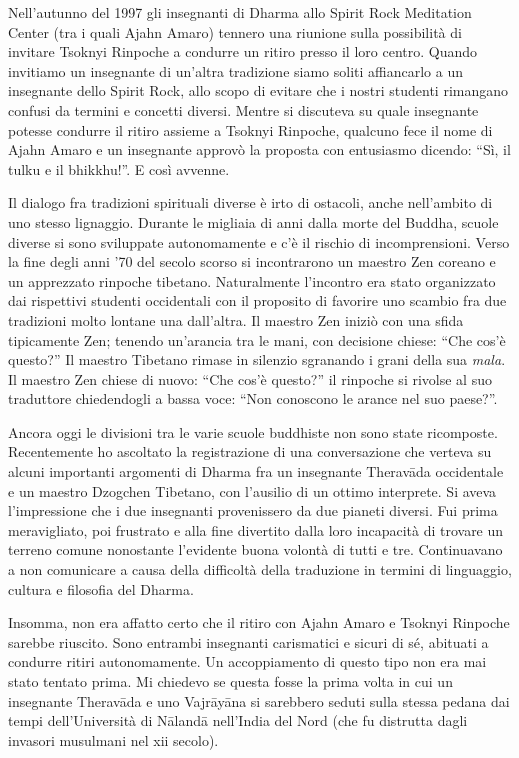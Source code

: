 Nell'autunno del 1997 gli insegnanti di Dharma allo Spirit Rock Meditation Center (tra i quali Ajahn Amaro) tennero una riunione sulla possibilità di invitare Tsoknyi Rinpoche a condurre un ritiro presso il loro centro. Quando invitiamo un insegnante di un'altra tradizione siamo soliti affiancarlo a un insegnante dello Spirit Rock, allo scopo di evitare che i nostri studenti rimangano confusi da termini e concetti diversi. Mentre si discuteva su quale insegnante potesse condurre il ritiro assieme a Tsoknyi Rinpoche, qualcuno fece il nome di Ajahn Amaro e un insegnante approvò la proposta con entusiasmo dicendo: ``Sì, il tulku e il bhikkhu!''. E così avvenne.

Il dialogo fra tradizioni spirituali diverse è irto di ostacoli, anche nell'ambito di uno stesso lignaggio. Durante le migliaia di anni dalla morte del Buddha, scuole diverse si sono sviluppate autonomamente e c'è il rischio di incomprensioni. Verso la fine degli anni '70 del secolo scorso si incontrarono un maestro Zen coreano e un apprezzato rinpoche tibetano. Naturalmente l'incontro era stato organizzato dai rispettivi studenti occidentali con il proposito di favorire uno scambio fra due tradizioni molto lontane una dall'altra. Il maestro Zen iniziò con una sfida tipicamente Zen; tenendo un'arancia tra le mani, con decisione chiese: ``Che cos'è questo?'' Il maestro Tibetano rimase in silenzio sgranando i grani della sua \textit{mala}. Il maestro Zen chiese di nuovo: ``Che cos'è questo?'' il rinpoche si rivolse al suo traduttore chiedendogli a bassa voce: ``Non conoscono le arance nel suo paese?''.

Ancora oggi le divisioni tra le varie scuole buddhiste non sono state ricomposte. Recentemente ho ascoltato la registrazione di una conversazione che verteva su alcuni importanti argomenti di Dharma fra un insegnante Theravāda occidentale e un maestro Dzogchen Tibetano, con l'ausilio di un ottimo interprete. Si aveva l'impressione che i due insegnanti provenissero da due pianeti diversi. Fui prima meravigliato, poi frustrato e alla fine divertito dalla loro incapacità di trovare un terreno comune nonostante l'evidente buona volontà di tutti e tre. Continuavano a non comunicare a causa della difficoltà della traduzione in termini di linguaggio, cultura e filosofia del Dharma.

Insomma, non era affatto certo che il ritiro con Ajahn Amaro e Tsoknyi Rinpoche sarebbe riuscito. Sono entrambi insegnanti carismatici e sicuri di sé, abituati a condurre ritiri autonomamente. Un accoppiamento di questo tipo non era mai stato tentato prima. Mi chiedevo se questa fosse la prima volta in cui un insegnante Theravāda e uno Vajrāyāna si sarebbero seduti sulla stessa pedana dai tempi dell'Università di Nālandā nell'India del Nord (che fu distrutta dagli invasori musulmani nel xii secolo).

